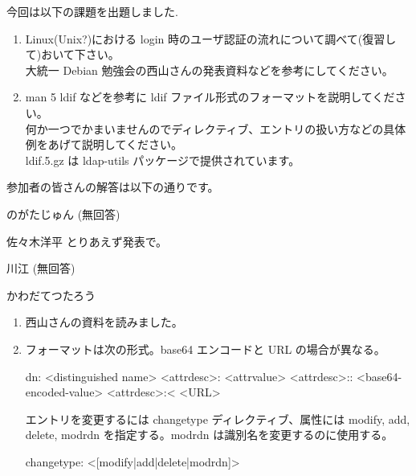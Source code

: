 \documentclass[mingoth,a4paper]{jsarticle}
\begin{document}
今回は以下の課題を出題しました.
\begin{screen}
  \begin{enumerate}
  \item Linux(Unix?)における login 時のユーザ認証の流れについて調べて(復習して)おいて下さい。\\
    大統一 Debian 勉強会の西山さんの発表資料などを参考にしてください。

  \item man 5 ldif などを参考に ldif ファイル形式のフォーマットを説明してください。\\
    何か一つでかまいませんのでディレクティブ、エントリの扱い方などの具体例をあげて説明してください。\\
    ldif.5.gz は ldap-utils パッケージで提供されています。

  \end{enumerate}
\end{screen}

参加者の皆さんの解答は以下の通りです。

\begin{prework}{ のがたじゅん }
  (無回答)
\end{prework}

\begin{prework}{ 佐々木洋平 }
とりあえず発表で。
\end{prework}

\begin{prework}{ 川江 }
  (無回答)
\end{prework}

\begin{prework}{ かわだてつたろう }
  \begin{enumerate}
  \item 西山さんの資料を読みました。
  \item フォーマットは次の形式。base64 エンコードと URL の場合が異なる。
    \begin{commandline}
      dn: <distinguished name>
      <attrdesc>: <attrvalue>
      <attrdesc>:: <base64-encoded-value>
      <attrdesc>:< <URL>
    \end{commandline}
    エントリを変更するには changetype ディレクティブ、属性には modify, add, delete, modrdn を指定する。modrdn は識別名を変更するのに使用する。
    \begin{commandline}
      changetype: <[modify|add|delete|modrdn]>
    \end{commandline}
  \end{enumerate}
\end{prework}
\end{document}
